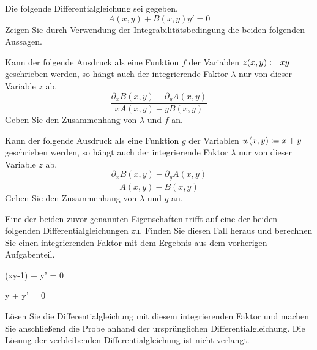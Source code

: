 \begin{atiTask}[
	title = Integrierende Faktoren
]
	\begin{atiSubtasks}
		\item{
			Die folgende Differentialgleichung sei gegeben.
			\[
				A(x,y) + B(x,y)y' = 0
			\]
			Zeigen Sie durch Verwendung der Integrabilitätsbedingung die beiden folgenden Aussagen.
			\begin{atiItems}
				\item{
					Kann der folgende Ausdruck als eine Funktion $f$ der Variablen $z(x,y)\coloneqq xy$ geschrieben werden, so hängt auch der integrierende Faktor $\lambda$ nur von dieser Variable $z$ ab.
					\[
						\frac{\partial_x B(x,y) - \partial_y A(x,y)}{xA(x,y)-yB(x,y)}
					\]
					Geben Sie den Zusammenhang von $\lambda$ und $f$ an.
				}
				\item{
					Kann der folgende Ausdruck als eine Funktion $g$ der Variablen $w(x,y)\coloneqq x + y$ geschrieben werden, so hängt auch der integrierende Faktor $\lambda$ nur von dieser Variable $z$ ab.
					\[
						\frac{\partial_x B(x,y) - \partial_y A(x,y)}{A(x,y)-B(x,y)}
					\]
					Geben Sie den Zusammenhang von $\lambda$ und $g$ an.

				}
			\end{atiItems}
		}
		\item{
			Eine der beiden zuvor genannten Eigenschaften trifft auf eine der beiden folgenden Differentialgleichungen zu.
			Finden Sie diesen Fall heraus und berechnen Sie einen integrierenden Faktor mit dem Ergebnis aus dem vorherigen Aufgabenteil.
			\begin{atiSubequations}
				\item{
					(xy-1) + y' = 0
				}
				\item{
					y + y' = 0
				}
			\end{atiSubequations}
			Lösen Sie die Differentialgleichung mit diesem integrierenden Faktor und machen Sie anschließend die Probe anhand der ursprünglichen Differentialgleichung.
			Die Lösung der verbleibenden Differentialgleichung ist nicht verlangt.
		}
	\end{atiSubtasks}
\end{atiTask}